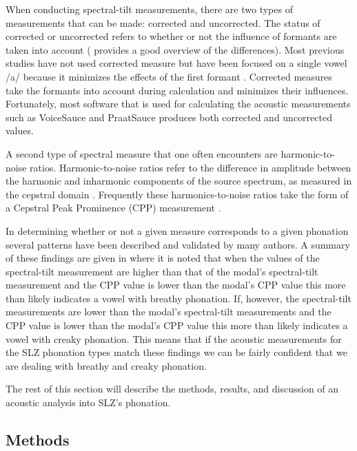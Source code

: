 \documentclass[12pt, letterpaper]{article}
\begin{document}
When conducting spectral-tilt measurements, there are two types of measurements that can be made: corrected and uncorrected. The status of corrected or uncorrected refers to whether or not the influence of formants are taken into account (\cite{garellekPhoneticsVoice2019} provides a good overview of the differences). Most previous studies have not used corrected measure but have been focused on a single vowel /a/ because it minimizes the effects of the first formant \citep{espositoVariationContrastivePhonation2010}. Corrected measures take the formants into account during calculation and minimizes their influences. Fortunately, most software that is used for calculating the acoustic measurements such as VoiceSauce \citep{shueVOICESAUCEProgramVoice2009} and PraatSauce \citep{kirbyPraatSauce2022} produces both corrected and uncorrected values. 

A second type of spectral measure that one often encounters are harmonic-to-noise ratios. Harmonic-to-noise ratios refer to the difference in amplitude between the harmonic and inharmonic components of the source spectrum, as measured in the cepstral domain \citep{dekromCepstrumBasedTechniqueDetermining1993}. Frequently these harmonics-to-noise ratios take the form of a Cepstral Peak Prominence (CPP) measurement \citep{hillenbrandAcousticCorrelatesBreathy1994}.

In determining whether or not a given measure corresponds to a given phonation several patterns have been described and validated by many authors. A summary of these findings are given in \citet{garellekPhoneticsVoice2019} where it is noted that when the values of the spectral-tilt measurement are higher than that of the modal's spectral-tilt measurement and the CPP value is lower than the modal's CPP value this more than likely indicates a vowel with breathy phonation. If, however, the spectral-tilt measurements are lower than the modal's spectral-tilt measurements and the CPP value is lower than the modal's CPP value this more than likely indicates a vowel with creaky phonation. This means that if the acoustic measurements for the SLZ phonation types match these findings we can be fairly confident that we are dealing with breathy and creaky phonation. 

The rest of this section will describe the methods, results, and discussion of an acoustic analysis into SLZ's phonation. 

\subsection{Methods} \label{sec:Methods}
\end{document}
